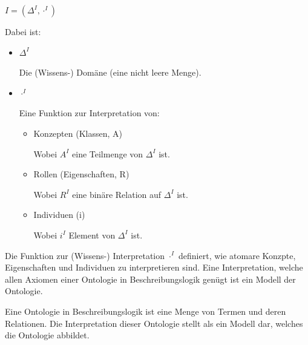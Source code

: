 \noindent\hspace*{16mm} $ I = (\Delta^I, \cdot^I) $

Dabei ist:
\begin{itemize}
\item $ \Delta^I $

    Die (Wissens-) Domäne (eine nicht leere Menge).

\item $ \cdot^I $

    Eine Funktion zur Interpretation von:
    \begin{itemize}
        \item Konzepten (Klassen, A)

            Wobei $ A^I $ eine Teilmenge von $ \Delta^I $ ist.
        \item Rollen (Eigenschaften, R)

            Wobei $ R^I $ eine binäre Relation auf $ \Delta^I $ ist.
        \item Individuen (i)

            Wobei $ i^I $ Element von $ \Delta^I $ ist.
    \end{itemize}
\end{itemize}

Die Funktion zur (Wissens-) Interpretation $ \cdot^I $ definiert, wie atomare Konzpte, Eigenschaften und Individuen zu interpretieren sind. Eine Interpretation, welche allen Axiomen einer Ontologie in Beschreibungslogik genügt ist ein Modell der Ontologie.

Eine Ontologie in Beschreibungslogik ist eine Menge von Termen und deren Relationen. Die Interpretation dieser Ontologie stellt als ein Modell dar, welches die Ontologie abbildet.

